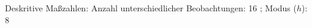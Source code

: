 				\label{tableValues:bstu09_g1}
				\vspace*{-\baselineskip}
                    \begin{noten}
                	    \note{} Deskritive Maßzahlen:
                	    Anzahl unterschiedlicher Beobachtungen: 16%
                	    ; 
                	      Modus ($h$): 8
                     \end{noten}


